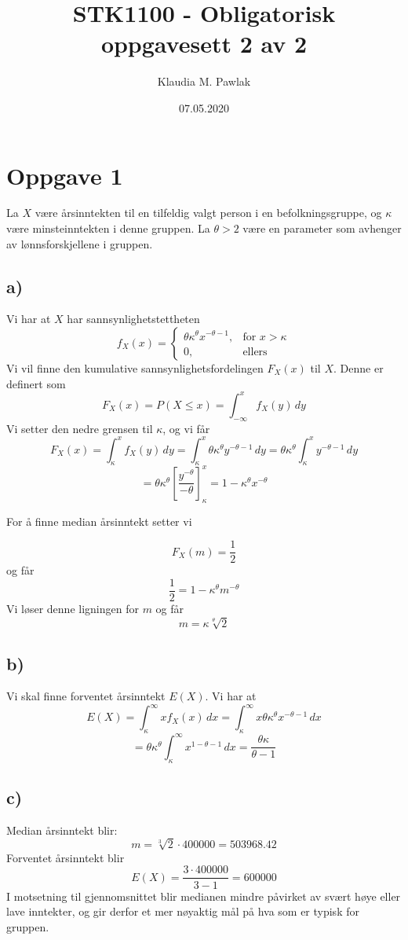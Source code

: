 \documentclass[a4paper, 12pt]{article}
\title{STK1100 - Obligatorisk oppgavesett 2 av 2}
\author{Klaudia M. Pawlak}
\date{07.05.2020}
\begin{document}
\maketitle

\section*{Oppgave 1}
\begin{FlushLeft}
La \( X \) være årsinntekten til en tilfeldig valgt person i en befolkningsgruppe, og \( \kappa \) være minsteinntekten i denne gruppen. La \( \theta > 2 \) være en parameter som avhenger av lønnsforskjellene i gruppen.
\end{FlushLeft}
\subsection*{a)}
Vi har at \( X \) har sannsynlighetstettheten
\[
f_X(x) = 
\begin{cases} 
\theta \kappa^\theta x^{-\theta-1}, & \text{for } x > \kappa \\
0, & \text{ellers}
\end{cases}
\]
Vi vil finne den kumulative sannsynlighetsfordelingen \( F_X(x) \) til \( X \). Denne er definert som
\[
F_X(x) = P(X \leq x) = \int_{-\infty}^{x} f_X(y) \, dy
\]
Vi setter den nedre grensen til \( \kappa \), og vi får
\[
F_X(x) = \int_{\kappa}^{x} f_X(y) \, dy = \int_{\kappa}^{x} \theta \kappa^\theta y^{-\theta-1} \, dy = \theta \kappa^\theta \int_{\kappa}^{x} y^{-\theta-1} \, dy
\]
\[
= \theta \kappa^\theta \left[ \frac{y^{-\theta}}{-\theta} \right]_{\kappa}^{x} = 1 - \kappa^\theta x^{-\theta}
\]
\begin{FlushLeft}
For å finne median årsinntekt setter vi
\end{FlushLeft}
\[
F_X(m) = \frac{1}{2}
\]
og får
\[
\frac{1}{2} = 1 - \kappa^\theta m^{-\theta}
\]
Vi løser denne ligningen for \( m \) og får
\[
m = \kappa \sqrt[\theta]{2}
\]

\subsection*{b)}
Vi skal finne forventet årsinntekt \( E(X) \). Vi har at
\[
E(X) = \int_{\kappa}^{\infty} x f_X(x) \, dx = \int_{\kappa}^{\infty} x \theta \kappa^\theta x^{-\theta-1} \, dx
\]
\[
= \theta \kappa^\theta \int_{\kappa}^{\infty} x^{1-\theta-1} \, dx = \frac{\theta \kappa}{\theta - 1}
\]

\subsection*{c)}
Median årsinntekt blir: 
\[
m = \sqrt[3]{2} \cdot 400000 = 503968.42
\]
Forventet årsinntekt blir 
\[
E(X) = \frac{3 \cdot 400000}{3 - 1} = 600000
\]
I motsetning til gjennomsnittet blir medianen mindre påvirket av svært høye eller lave inntekter, og gir derfor et mer nøyaktig mål på hva som er typisk for gruppen.
\end{document}
